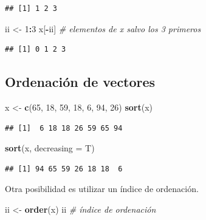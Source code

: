 \documentclass[]{book}
\newenvironment{Shaded}{\begin{snugshade}}{\end{snugshade}}
\newcommand{\KeywordTok}[1]{\textcolor[rgb]{0.13,0.29,0.53}{\textbf{#1}}}
\newcommand{\DataTypeTok}[1]{\textcolor[rgb]{0.13,0.29,0.53}{#1}}
\newcommand{\DecValTok}[1]{\textcolor[rgb]{0.00,0.00,0.81}{#1}}
\newcommand{\StringTok}[1]{\textcolor[rgb]{0.31,0.60,0.02}{#1}}
\newcommand{\CommentTok}[1]{\textcolor[rgb]{0.56,0.35,0.01}{\textit{#1}}}
\newcommand{\OperatorTok}[1]{\textcolor[rgb]{0.81,0.36,0.00}{\textbf{#1}}}
\newcommand{\NormalTok}[1]{#1}
\begin{document}
\begin{verbatim}
## [1] 1 2 3
\end{verbatim}

\begin{Shaded}
\begin{Highlighting}[]
\NormalTok{ii <-}\StringTok{ }\DecValTok{1}\OperatorTok{:}\DecValTok{3}
\NormalTok{x[}\OperatorTok{-}\NormalTok{ii]  }\CommentTok{# elementos de x salvo los 3 primeros}
\end{Highlighting}
\end{Shaded}

\begin{verbatim}
## [1] 0 1 2 3
\end{verbatim}

\subsection{Ordenación de vectores}\label{ordenacion-de-vectores}

\begin{Shaded}
\begin{Highlighting}[]
\NormalTok{x <-}\StringTok{ }\KeywordTok{c}\NormalTok{(}\DecValTok{65}\NormalTok{, }\DecValTok{18}\NormalTok{, }\DecValTok{59}\NormalTok{, }\DecValTok{18}\NormalTok{, }\DecValTok{6}\NormalTok{, }\DecValTok{94}\NormalTok{, }\DecValTok{26}\NormalTok{)}
\KeywordTok{sort}\NormalTok{(x)}
\end{Highlighting}
\end{Shaded}

\begin{verbatim}
## [1]  6 18 18 26 59 65 94
\end{verbatim}

\begin{Shaded}
\begin{Highlighting}[]
\KeywordTok{sort}\NormalTok{(x, }\DataTypeTok{decreasing =}\NormalTok{ T)}
\end{Highlighting}
\end{Shaded}

\begin{verbatim}
## [1] 94 65 59 26 18 18  6
\end{verbatim}

Otra posibilidad es utilizar un índice de ordenación.

\begin{Shaded}
\begin{Highlighting}[]
\NormalTok{ii <-}\StringTok{ }\KeywordTok{order}\NormalTok{(x)}
\NormalTok{ii  }\CommentTok{# índice de ordenación}
\end{Highlighting}
\end{Shaded}
\end{document}

